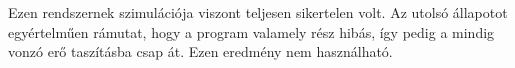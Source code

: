 Ezen rendszernek szimulációja viszont teljesen sikertelen volt. Az utolsó állapotot egyértelműen rámutat, hogy a program valamely rész hibás, így pedig a mindig vonzó erő taszításba csap át. Ezen eredmény nem használható.
